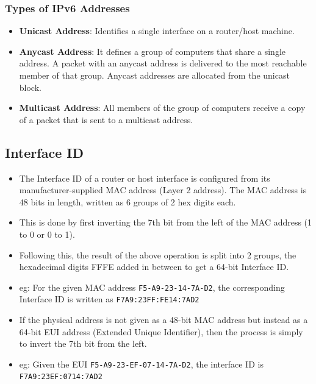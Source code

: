 \documentclass[a4paper]{article}
\theoremstyle{plain}
\theoremstyle{definition}
\begin{document}
\subsubsection{Types of IPv6 Addresses}
\begin{itemize}
    \item \textbf{Unicast Address}: Identifies a single interface on a router/host machine. 
    
    \item \textbf{Anycast Address}: It defines a group of computers that share a single address. A packet with an anycast address is delivered to the most reachable member of that group. Anycast addresses are allocated from the unicast block.
    
    \item \textbf{Multicast Address}: All members of the group of computers receive a copy of a packet that is sent to a multicast address. 
\end{itemize}

\subsection{Interface ID}
\begin{itemize}
    \item The Interface ID of a router or host interface is configured from its manufacturer-supplied MAC address (Layer 2 address). The MAC address is 48 bits in length, written as 6 groups of 2 hex digits each. 
    
    \item This is done by first inverting the 7th bit from the left of the MAC address (1 to 0 or 0 to 1). 
    
    \item Following this, the result of the above operation is split into 2 groups, the hexadecimal digits FFFE added in between to get a 64-bit Interface ID. 
    
    \item eg: For the given MAC address \texttt{F5-A9-23-14-7A-D2}, the corresponding Interface ID is written as  \texttt{F7A9:23FF:FE14:7AD2}
    
    \item If the physical address is not given as a 48-bit MAC address but instead as a 64-bit EUI address (Extended Unique Identifier), then the process is simply to invert the 7th bit from the left. 
    
    \item eg: Given the EUI \texttt{F5-A9-23-EF-07-14-7A-D2}, the interface ID is \texttt{F7A9:23EF:0714:7AD2}
\end{itemize}
\end{document}
